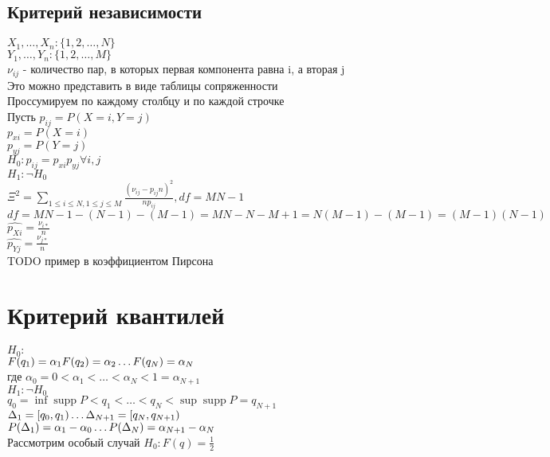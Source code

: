 \documentclass{article}
\newcommand\0{\mathbb{0}}
\DeclareMathOperator{\supp}{supp}
\newcommand\1{\mathbb{1}}
\begin{document}
\subsection{Критерий независимости}
$X_1, \dots, X_n: \{1, 2, \dots, N\}$\\
$Y_1, \dots, Y_n: \{1, 2, \dots, M\}$\\
$\nu_{ij}$ - количество пар, в которых первая компонента равна i, а вторая j\\
Это можно представить в виде таблицы  сопряженности\\
Проссумируем по каждому столбцу и по каждой строчке\\
Пусть $p_{ij} = P(X = i, Y = j)$\\
$p_{xi} = P(X = i)$\\
$p_{yj} = P(Y = j)$\\
$H_0: p_{ij} = p_{xi} p_{yj} \forall i, j$\\
$H_1: \neg H_0$\\
$\Xi^2 = \displaystyle\sum_{1 \leq i \leq N, 1 \leq j \leq M} \frac{(\nu_{ij} - p_{ij}n)^2}{np_{ij}}, df = MN - 1$\\
$df = MN - 1 - (N - 1) - (M - 1) = MN - N - M + 1 = N(M - 1) - (M - 1) = (M - 1)(N - 1)$\\
$\widehat{p_{Xi}} = \frac{\nu_{i*}}{n}$\\
$\widehat{p_{Yj}} = \frac{\nu_{j*}}{n}$\\
TODO пример в коэффициентом Пирсона
\section{Критерий квантилей}
$H_0:$\\
$F(q_1) = \alpha_1\\
F(q_2) = \alpha_2\\
\dots \\
F(q_N) = \alpha_N$\\
где $\alpha_0 = 0 < \alpha_1 < \dots < \alpha_N < 1 = \alpha_{N + 1}$\\
$H_1: \neg H_0$\\
$q_0 = \inf \supp P < q_1 < \dots < q_N < \sup \supp P = q_{N + 1}$\\
$\Delta_1 = [q_0, q_1)\\
\dots\\
\Delta_{N + 1} = [q_N, q_{N + 1})$\\
$P(\Delta_1) = \alpha_1 - \alpha_0\\
\dots\\
P(\Delta_N) = \alpha_{N + 1} - \alpha_N$\\
Рассмотрим особый случай $H_0: F(q) = \frac{1}{2}$\\
\end{document}
